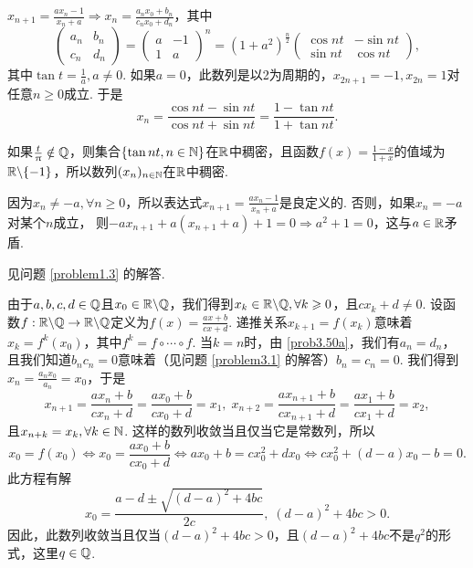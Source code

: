 \begin{solution}
  $x_{n+1}=\frac{ax_n-1}{x_n+a}\Rightarrow x_n=\frac{a_nx_0+b_n}{c_nx_0+d_n}$，其中
  \[
    \begin{pmatrix}
      a_n & b_n \\
      c_n & d_n
    \end{pmatrix} = \begin{pmatrix}
      a & - 1\\
      1 & a
    \end{pmatrix}^n = 
    (1 + a^2)^{\frac n2}
    \begin{pmatrix}
      \cos nt & - \sin nt \\
      \sin nt & \cos nt
    \end{pmatrix},
  \]
  其中$\tan t=\frac1a,a\ne0$. 如果$a=0$，此数列是以2为周期的，$x_{2n+1}=-1,x_{2n}=1$对任意$n\ge0$成立. 于是
  \[
    x_n = \frac{\cos nt - \sin nt}{\cos nt + \sin nt } = \frac{1 - \tan nt}{1+ \tan nt}.
  \]

  如果$\frac t{\uppi}\notin\mathbb Q$，则集合$\{\tan nt,n\in\mathbb N\}$在$\mathbb R$中稠密，且函数$f(x)=\frac{1-x}{1+x}$的值域为$\mathbb R\backslash\{-1\}$，所以数列$(x_n)_{n\in\mathbb N}$在$\mathbb R$中稠密.

  因为$x_n\ne-a,\forall n\ge0$，所以表达式$x_{n+1}=\frac{ax_n-1}{x_n+a}$是良定义的. 否则，如果$x_n=-a$对某个$n$成立， 则$-ax_{n+1}+a(x_{n+1}+a)+1=0\Rightarrow a^2+1=0$，这与$a\in\mathbb R$矛盾.
\end{solution}

\setcounter{solution}{49}

\begin{solution}
  \begin{inparaenum}[(a)]
    \item 见问题 \ref{problem1.3} 的解答.

    \item 由于$a,b,c,d\in\mathbb Q$且$x_0\in\mathbb R\backslash
    \mathbb Q$，我们得到$x_k\in\mathbb R\backslash\mathbb Q,\forall k\geqslant0$，且$cx_k+d\ne 0$. 设函数$f:\mathbb R\backslash\mathbb Q\to\mathbb R\backslash\mathbb Q$定义为$f(x)=\frac{ax+b}{cx+d}$. 递推关系$x_{k+1}=f(x_k)$意味着$x_k=f^k(x_0)$，其中$f^k=f\circ\cdots\circ f$. 当$k=n$时，由 \ref{prob3.50a}，我们有$a_n=d_n$，且我们知道$b_nc_n=0$意味着（见问题 \ref{problem3.1} 的解答）$b_n=c_n=0$. 我们得到$x_n=\frac{a_nx_0}{a_n}=x_0$，于是
    \[
      x_{n+1} = \frac{ax_n+b}{cx_n+d} = \frac{ax_0+b}{cx_0+d} = x_1,\;
      x_{n+2} = \frac{ax_{n+1}+b}{cx_{n+1}+d}
      = \frac{ax_1+b}{cx_1+d} = x_2,
    \]
    且$x_{n+k}=x_k,\forall k\in\mathbb N$. 这样的数列收敛当且仅当它是常数列，所以
    \[
      x_0 = f(x_0) \Leftrightarrow
    x_0 = \frac{ax_0 + b}{cx_0 + d} \Leftrightarrow
    ax_0 + b = cx_0^2 + dx_0
    \Leftrightarrow cx_0^2 + (d - a)x_0 - b = 0.
    \]
    此方程有解
    \[
      x_0 = \frac{a - d \pm\sqrt{(d-a)^2 + 4bc}}{2c},\; (d - a)^2 + 4bc >0.
    \]
    因此，此数列收敛当且仅当$(d-a)^2+4bc>0$，且$(d-a)^2+4bc$不是$q^2$的形式，这里$q\in\mathbb Q$.
  \end{inparaenum}
\end{solution}

